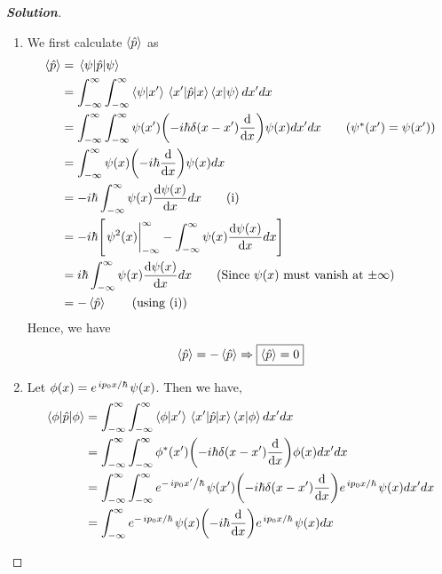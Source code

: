 \documentclass[10pt]{scrartcl}
\theoremstyle{definition}
\newenvironment{solution} {\begin{proof}[\normalfont \textbf{Solution}]} {\end{proof}}
\newcommand*{\Op}{\hat{p}}
\begin{document}
\begin{solution}
    $ $
    \begin{enumerate}[label=(\alph*)]
        \item We first calculate $\expval{\Op}$ as
            \begin{align*}
                \expval{\Op} &= \ev{\Op}{\psi} \\ 
                             &= \int_{-\infty}^{\infty} \int_{-\infty}^{\infty} \ip{\psi}{x'} \mel{x'}{\Op}{x} \ip{x}{\psi} dx'dx \\ 
                             &= \int_{-\infty}^{\infty} \int_{-\infty}^{\infty} \psi(x') \qty(-i\hbar \delta(x - x')\dv{x}) \psi(x) dx'dx \tag{$\psi^*(x') = \psi(x')$}\\ 
                             &= \int_{-\infty}^{\infty} \psi(x) \qty(-i\hbar \dv{x}) \psi(x) dx \\ 
                             &= -i\hbar \int_{-\infty}^{\infty} \psi(x) \dv{\psi(x)}{x} dx \tag{i}\\ 
                             &= -i\hbar \qty[ \eval{\psi^2(x)}_{-\infty}^{\infty} - \int_{-\infty}^{\infty} \psi(x) \dv{\psi(x)}{x} dx] \\ 
                             &= i\hbar \int_{-\infty}^{\infty} \psi(x) \dv{\psi(x)}{x} dx  \tag{Since $\psi(x)$ must vanish at $\pm \infty$}\\
                             &= -\expval{\Op} \tag{using (i)} \\
            \end{align*}
            Hence, we have $$\expval{\Op} = - \expval{\Op} \Rightarrow \boxed{\expval{\Op} = 0}$$
        \item Let $\phi(x) = e^{\flatfrac{ip_0x}{\hbar}}\psi(x)$. Then we have,
            \begin{align*}
                \ev{\Op}{\phi}  &= \int_{-\infty}^{\infty} \int_{-\infty}^{\infty} \ip{\phi}{x'} \mel{x'}{\Op}{x} \ip{x}{\phi} dx'dx \\ 
                                &= \int_{-\infty}^{\infty} \int_{-\infty}^{\infty} \phi^*(x') \qty(-i\hbar \delta(x - x')\dv{x}) \phi(x) dx'dx \\ 
                                &= \int_{-\infty}^{\infty} \int_{-\infty}^{\infty} e^{-\flatfrac{ip_0x'}{\hbar}}\psi(x') \qty(-i\hbar \delta(x - x')\dv{x}) e^{\flatfrac{ip_0x}{\hbar}}\psi(x) dx'dx \\ 
                                &= \int_{-\infty}^{\infty}  e^{-\flatfrac{ip_0x}{\hbar}}\psi(x) \qty(-i\hbar \dv{x}) e^{\flatfrac{ip_0x}{\hbar}}\psi(x) dx \\ 

\end{align*}
\end{enumerate}
\end{solution}
\end{document}
